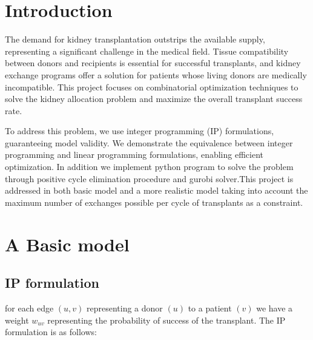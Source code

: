 \documentclass{ULBreport}
\begin{document}

\chapter{Introduction}
The demand for kidney transplantation outstrips the available supply, representing a significant challenge in the medical field. Tissue compatibility between donors and recipients is essential for successful transplants, and kidney exchange programs offer a solution for patients whose living donors are medically incompatible. This project focuses on combinatorial optimization techniques to solve the kidney allocation problem and maximize the overall transplant success rate.

To address this problem, we use integer programming (IP) formulations, guaranteeing model validity. We demonstrate the equivalence between integer programming and linear programming formulations, enabling efficient optimization. In addition we implement python program to solve the problem through positive cycle elimination procedure and gurobi solver.This project is addressed in both basic model and a more realistic model taking into account the maximum number of exchanges possible per cycle of transplants as a constraint.

\chapter{A Basic model}

\section{IP formulation}
for each edge $(u, v)$ representing a donor $(u)$ to a patient $(v)$ we have a weight $w_{uv}$ representing the probability of success of the transplant. The IP formulation is as follows:
\end{document}
